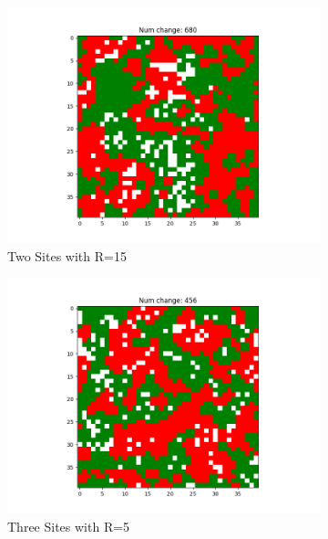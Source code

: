 \documentclass[11pt]{article}
\begin{document}
\begin{figure}[h]
\begin{subfigure}{0.14\textwidth}
			\includegraphics[width=\linewidth]{policy3_final_h2r15.png}
			\caption{\centering Two Sites with R=15}
		\end{subfigure}\hfill
		\begin{subfigure}{0.14\textwidth}
			\includegraphics[width=\linewidth]{policy3_final_h3r5.png}
			\caption{\centering Three Sites with R=5}
		\end{subfigure}\hfill
		\begin{subfigure}{0.14\textwidth}

\end{subfigure}
\end{figure}
\end{document}
